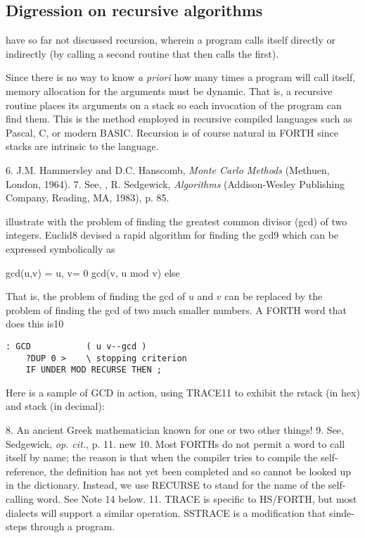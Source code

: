 \subsection{Digression on recursive algorithms}
 have so far not discussed recursion, wherein a program calls itself directly or indirectly (by calling a second routine that then calls the ﬁrst).

Since there is no way to know \textit{a priori} how many times a program will call itself, memory allocation for the arguments must be dynamic. That is, a recursive routine places its arguments on a stack so each invocation of the program can ﬁnd them. This is the method employed in recursive compiled languages such as Pascal, C, or modern BASIC. Recursion is of course natural in FORTH
since stacks are intrinsic to the language.

6. J.M. Hammersley and D.C. Hanscomb, \textit{Monte Carlo Methods} (Methuen, London, 1964).
7. See, \eg, R. Sedgewick, \textit{Algorithms} (Addison-Wesley Publishing Company, Reading, MA, 1983), p. 85.

 illustrate with the problem of finding the greatest common divisor (gcd) of two integers. Euclid8 devised a rapid algorithm for ﬁnding the gcd9 which can be expressed symbolically as

gcd(u,v) = u, v= 0
           gcd(v, u mod v) else

That is, the problem of ﬁnding the gcd of $u$ and $v$ can be replaced by the problem of ﬁnding the gcd of two much smaller numbers. A FORTH word that does this is10

\begin{lstlisting}
: GCD           ( u v--gcd )
    ?DUP 0 >    \ stopping criterion
    IF UNDER MOD RECURSE THEN ;
\end{lstlisting}

Here is a sample of GCD in action, using TRACE11 to exhibit the rstack (in hex) and stack (in decimal):

8. An ancient Greek mathematician known for one or two other things!
9. See, \eg Sedgewick, \textit{op. cit.}, p. 11.
new
10. Most FORTHs do not permit a word to call itself by name; the reason is that when the compiler tries to compile the self-reference, the deﬁnition has not yet been completed and so cannot be looked up in the dictionary. Instead, we use RECURSE to stand for the name of the self-calling word. See Note 14 below.
11. TRACE is specific to HS/FORTH, but most dialects will support a similar operation. SSTRACE is a modiﬁcation that sinde-steps through a program.

